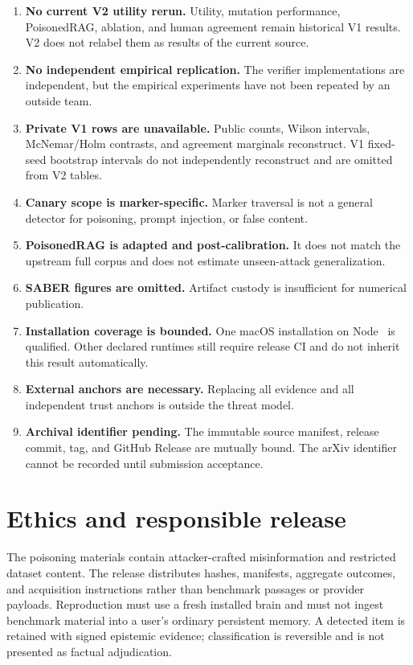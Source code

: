 \documentclass[10pt]{article}
\begin{document}
\begin{enumerate}
  \item \textbf{No current V2 utility rerun.} Utility, mutation performance,
  PoisonedRAG, ablation, and human agreement remain historical V1 results. V2
  does not relabel them as results of the current source.
  \item \textbf{No independent empirical replication.} The verifier
  implementations are independent, but the empirical experiments have not been
  repeated by an outside team.
  \item \textbf{Private V1 rows are unavailable.} Public counts, Wilson
  intervals, McNemar/Holm contrasts, and agreement marginals reconstruct. V1
  fixed-seed bootstrap intervals do not independently reconstruct and are
  omitted from V2 tables.
  \item \textbf{Canary scope is marker-specific.} Marker traversal is not a
  general detector for poisoning, prompt injection, or false content.
  \item \textbf{PoisonedRAG is adapted and post-calibration.} It does not match
  the upstream full corpus and does not estimate unseen-attack generalization.
  \item \textbf{SABER figures are omitted.} Artifact custody is insufficient
  for numerical publication.
  \item \textbf{Installation coverage is bounded.} One macOS installation on
  Node \MutMemInstallerNodeVersion\ is qualified. Other declared runtimes still
  require release CI and do not inherit this result automatically.
  \item \textbf{External anchors are necessary.} Replacing all evidence and all
  independent trust anchors is outside the threat model.
  \item \textbf{Archival identifier pending.} The immutable source manifest,
  release commit, tag, and GitHub Release are mutually bound. The arXiv
  identifier cannot be recorded until submission acceptance.
\end{enumerate}

\section{Ethics and responsible release}

The poisoning materials contain attacker-crafted misinformation and restricted
dataset content. The release distributes hashes, manifests, aggregate outcomes,
and acquisition instructions rather than benchmark passages or provider
payloads. Reproduction must use a fresh installed brain and must not ingest
benchmark material into a user's ordinary persistent memory. A detected item is
retained with signed epistemic evidence; classification is reversible and is
not presented as factual adjudication.
\end{document}
